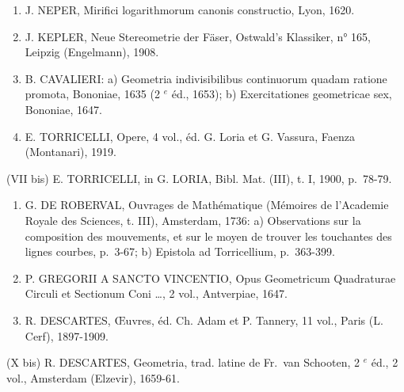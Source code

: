 \begin{enumerate}
\def\labelenumi{(\Roman{enumi})}
\setcounter{enumi}{3}
\item
  J. NEPER, Mirifici logarithmorum canonis constructio, Lyon, 1620.
\item
  J. KEPLER, Neue Stereometrie der Fäser, Ostwald's Klassiker, n° 165, Leipzig (Engelmann), 1908.
\item
  B. CAVALIERI: a) Geometria indivisibilibus continuorum quadam ratione promota, Bononiae, 1635 (2 \(^{e}\) éd., 1653); b) Exercitationes geometricae sex, Bononiae, 1647.
\item
  E. TORRICELLI, Opere, 4 vol., éd. G. Loria et G. Vassura, Faenza (Montanari), 1919.
\end{enumerate}

(VII bis) E. TORRICELLI, in G. LORIA, Bibl. Mat. (III), t. I, 1900, p.~78-79.

\begin{enumerate}
\def\labelenumi{(\Roman{enumi})}
\setcounter{enumi}{7}
\item
  G. DE ROBERVAL, Ouvrages de Mathématique (Mémoires de l'Academie Royale des Sciences, t. III), Amsterdam, 1736: a) Observations sur la composition des mouvements, et sur le moyen de trouver les touchantes des lignes courbes, p.~3-67; b) Epistola ad Torricellium, p.~363-399.
\item
  P. GREGORII A SANCTO VINCENTIO, Opus Geometricum Quadraturae Circuli et Sectionum Coni \ldots, 2 vol., Antverpiae, 1647.
\item
  R. DESCARTES, Œuvres, éd. Ch. Adam et P. Tannery, 11 vol., Paris (L. Cerf), 1897-1909.
\end{enumerate}

(X bis) R. DESCARTES, Geometria, trad. latine de Fr.~van Schooten, 2 \(^{e}\) éd., 2 vol., Amsterdam (Elzevir), 1659-61.

